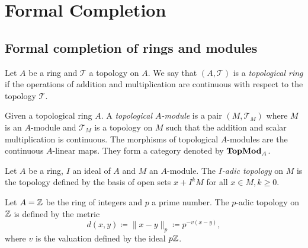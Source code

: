 \section{Formal Completion}

\subsection{Formal completion of rings and modules}

    \begin{definition}\label{def: topological ring and topological modules}
        Let \(A\) be a ring and \(\mathcal{T}\) a topology on \(A\).
        We say that \((A, \mathcal{T})\) is a \emph{topological ring} if the operations of addition and multiplication are continuous with respect to the topology \(\mathcal{T}\).
        
        Given a topological ring \(A\).
        A \emph{topological \(A\)-module} is a pair \((M, \mathcal{T}_M)\) where \(M\) is an \(A\)-module and \(\mathcal{T}_M\) is a topology on \(M\) such that the addition and scalar multiplication is continuous.
        The morphisms of topological \(A\)-modules are the continuous \(A\)-linear maps.
        They form a category denoted by \(\mathbf{TopMod}_A\).
    \end{definition}

    \begin{definition}\label{def: I-adic topology}
        Let \(A\) be a ring, \(I\) an ideal of \(A\) and \(M\) an \(A\)-module. 
        The \emph{\(I\)-adic topology} on \(M\) is the topology defined by the basis of open sets \(x + I^kM\) for all \(x \in M, k \geq 0\).
    \end{definition}

    \begin{example}\label{eg: p-adic topology on Z}
        Let \(A = {\mathbb{Z}}\) be the ring of integers and \(p\) a prime number.
        The \(p\)-adic topology on \({\mathbb{Z}}\) is defined by the metric
        \[ d(x, y) \coloneqq \|x-y\|_p \coloneqq p^{-v(x-y)}, \]
        where \(v\) is the valuation defined by the ideal \(p{\mathbb{Z}}\).
    \end{example}

